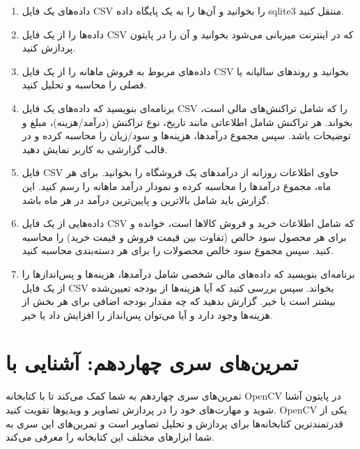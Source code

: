 \documentclass[b5paper,12pt]{article}
\begin{document}
\begin{enumerate}
		\item داده‌های یک فایل CSV را بخوانید و آن‌ها را به یک پایگاه داده sqlite3 منتقل کنید.
		\item داده‌ها را از یک فایل CSV که در اینترنت میزبانی می‌شود بخوانید و آن را در پایتون پردازش کنید.
		\item داده‌های مربوط به فروش ماهانه را از یک فایل CSV بخوانید و روندهای سالیانه یا فصلی را محاسبه و تحلیل کنید.
		\item برنامه‌ای بنویسید که داده‌های یک فایل CSV را که شامل تراکنش‌های مالی است، بخواند. هر تراکنش شامل اطلاعاتی مانند تاریخ، نوع تراکنش (درآمد/هزینه)، مبلغ و توضیحات باشد. سپس مجموع درآمدها، هزینه‌ها و سود/زیان را محاسبه کرده و در قالب گزارشی به کاربر نمایش دهید.
		\item فایل CSV حاوی اطلاعات روزانه از درآمدهای یک فروشگاه را بخوانید. برای هر ماه، مجموع درآمدها را محاسبه کرده و نمودار درآمد ماهانه را رسم کنید. این گزارش باید شامل بالاترین و پایین‌ترین درآمد در هر ماه باشد.
		\item داده‌هایی از یک فایل CSV که شامل اطلاعات خرید و فروش کالاها است، خوانده و برای هر محصول سود خالص (تفاوت بین قیمت فروش و قیمت خرید) را محاسبه کنید. سپس مجموع سود خالص محصولات را برای هر دسته‌بندی محاسبه کنید.
		\item برنامه‌ای بنویسید که داده‌های مالی شخصی شامل درآمدها، هزینه‌ها و پس‌اندازها را از یک فایل CSV بخواند. سپس بررسی کنید که آیا هزینه‌ها از بودجه تعیین‌شده بیشتر است یا خیر. گزارش بدهید که چه مقدار بودجه اضافی برای هر بخش از هزینه‌ها وجود دارد و آیا می‌توان پس‌انداز را افزایش داد یا خیر.
	\end{enumerate}
	
	\newpage
	\section*{تمرین‌های سری چهاردهم: آشنایی با}
	تمرین‌های سری چهاردهم به شما کمک می‌کند تا با کتابخانه OpenCV در پایتون آشنا شوید و مهارت‌های خود را در پردازش تصاویر و ویدیوها تقویت کنید. OpenCV یکی از قدرتمندترین کتابخانه‌ها برای پردازش و تحلیل تصاویر است و تمرین‌های این سری به شما ابزارهای مختلف این کتابخانه را معرفی می‌کند.
	
\end{document}
